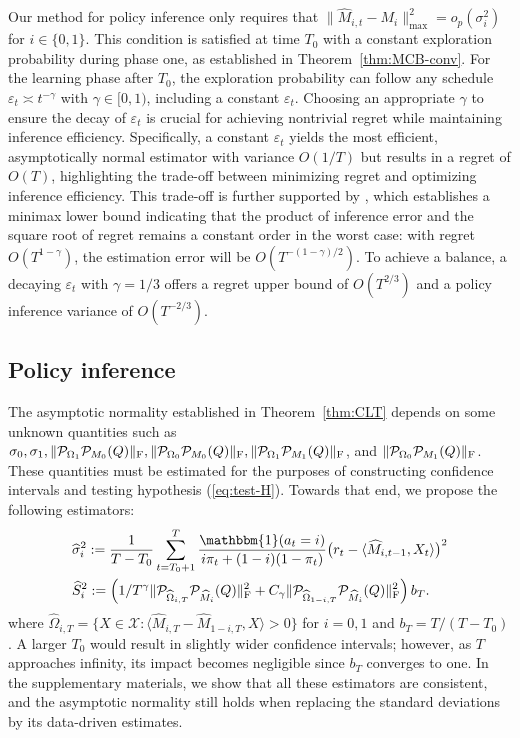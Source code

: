\documentclass[12pt]{article}
\newcommand\fro[1]{\| #1 \|_{\rm{F}}}
\newcommand{\inp}[2]{\langle #1,#2\rangle}
\def\calP{{\mathcal P}}
\def\hat{\widehat}
\theoremstyle{plain}
\begin{document}
Our method for policy inference only requires that $\|\widehat{M}_{i,t}-M_i\|_{\max}^2=o_p(\sigma_i^2)$ for $i\in\{0,1\}$. This condition is satisfied at time $T_0$ with a constant exploration probability during phase one, as established in Theorem~\ref{thm:MCB-conv}. For the learning phase after $T_0$, the exploration probability can follow any schedule $\varepsilon_t\asymp t^{-\gamma}$ with $\gamma\in[0,1)$, including a constant $\varepsilon_t$. 
Choosing an appropriate $\gamma$ to ensure the decay of $\varepsilon_t$ is crucial for achieving nontrivial regret while maintaining inference efficiency. Specifically, a constant $\varepsilon_t$ yields the most efficient, asymptotically normal estimator with variance $O(1/T)$ but results in a regret of $O(T)$, highlighting the trade-off between minimizing regret and optimizing inference efficiency. This trade-off is further supported by \cite{simchi2023multi}, which establishes a minimax lower bound indicating that the product of inference error and the square root of regret remains a constant order in the worst case: with regret $O(T^{1-\gamma})$, the estimation error will be $O(T^{-(1-\gamma)/2})$. To achieve a balance, a decaying $\varepsilon_t$ with $\gamma=1/3$ offers a regret upper bound of $O(T^{2/3})$ and a policy inference variance of $O(T^{-2/3})$.




\subsection{Policy inference}

The asymptotic normality established in Theorem~\ref{thm:CLT} depends on some unknown quantities such as $\sigma_0, \sigma_1, \|\mathcal{P}_{\Omega_1}\calP_{M_0}(Q)\|_{\rm F}, \|\mathcal{P}_{\Omega_0}\calP_{M_0}(Q)\|_{\rm F}, \|\mathcal{P}_{\Omega_1}\calP_{M_1}(Q)\|_{\rm F}$, and $\|\mathcal{P}_{\Omega_0}\calP_{M_1}(Q)\|_{\rm F}$. These quantities must be estimated for the purposes of constructing confidence intervals and testing hypothesis (\ref{eq:test-H}). Towards that end, we propose the following estimators:
\begin{align*}
    &\hat\sigma_i^2:=\frac{1}{T-T_0}\sum_{t=T_0+1}^T \frac{\mathbbm{1}(a_t=i)}{i\pi_t+(1-i)(1-\pi_t)} \big(r_t-\langle \hat M_{i, t-1}, X_t\rangle\big)^2 \\
    &\widehat{S}_i^2:= \left(1/T^{\gamma}\fro{\calP_{\widehat{\Omega}_{i,T}}\calP_{\hat M_i}(Q)}^2+C_{\gamma}\fro{\calP_{\widehat{\Omega}_{1-i,T}}\calP_{\hat M_i}(Q)}^2\right)b_T.
\end{align*}
where $\widehat{\Omega}_{i,T}=\{X\in \mathcal{X}: \inp{\widehat{M}_{i,T}-\widehat{M}_{1-i,T}}{X}>0\}$ for $i=0,1$ and $b_T=T/(T-T_0)$. A larger $T_0$ would result in slightly wider confidence intervals; however, as $T$ approaches infinity, its impact becomes negligible since $b_T$ converges to one. In the supplementary materials, we show that all these estimators are consistent, and the asymptotic normality still holds when replacing the standard deviations by its data-driven estimates. 
\end{document}
